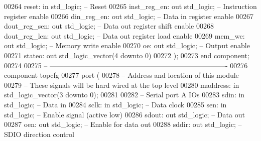 \begin{DoxyCode}
00264         reset: \textcolor{keywordflow}{in} \textcolor{comment}{std\_logic};                \textcolor{keyword}{-- Reset}
00265         inst\_reg\_en: \textcolor{keywordflow}{out} \textcolor{comment}{std\_logic};         \textcolor{keyword}{-- Instruction register enable}
00266         din\_reg\_en: \textcolor{keywordflow}{out} \textcolor{comment}{std\_logic};          \textcolor{keyword}{-- Data in register enable}
00267         dout\_reg\_sen: \textcolor{keywordflow}{out} \textcolor{comment}{std\_logic};            \textcolor{keyword}{-- Data out register shift enable}
00268         dout\_reg\_len: \textcolor{keywordflow}{out} \textcolor{comment}{std\_logic};            \textcolor{keyword}{-- Data out register load enable}
00269         mem\_we: \textcolor{keywordflow}{out} \textcolor{comment}{std\_logic};              \textcolor{keyword}{-- Memory write enable}
00270         oe: \textcolor{keywordflow}{out} \textcolor{comment}{std\_logic};              \textcolor{keyword}{-- Output enable}
00271         stateo: \textcolor{keywordflow}{out} \textcolor{comment}{std\_logic\_vector}(\textcolor{vhdllogic}{}\textcolor{vhdllogic}{4} \textcolor{keywordflow}{downto} \textcolor{vhdllogic}{}\textcolor{vhdllogic}{0})
00272     );
00273 \textcolor{keywordflow}{end} \textcolor{keywordflow}{component};
00274 
00275 \textcolor{keyword}{-- ----------------------------------------------------------------------------}
00276 \textcolor{keywordflow}{component} topcfg
00277     \textcolor{keywordflow}{port} (
00278 \textcolor{keyword}{        -- Address and location of this module}
00279 \textcolor{keyword}{        -- These signals will be hard wired at the top level}
00280         maddress: \textcolor{keywordflow}{in} \textcolor{comment}{std\_logic\_vector}(\textcolor{vhdllogic}{}\textcolor{vhdllogic}{3} \textcolor{keywordflow}{downto} \textcolor{vhdllogic}{}\textcolor{vhdllogic}{0});
00281     
00282 \textcolor{keyword}{        -- Serial port A IOs}
00283         sdin: \textcolor{keywordflow}{in} \textcolor{comment}{std\_logic};     \textcolor{keyword}{-- Data in}
00284         sclk: \textcolor{keywordflow}{in} \textcolor{comment}{std\_logic};     \textcolor{keyword}{-- Data clock}
00285         sen: \textcolor{keywordflow}{in} \textcolor{comment}{std\_logic};  \textcolor{keyword}{-- Enable signal (active low)}
00286         sdout: \textcolor{keywordflow}{out} \textcolor{comment}{std\_logic};   \textcolor{keyword}{-- Data out}
00287         oen: \textcolor{keywordflow}{out} \textcolor{comment}{std\_logic};         \textcolor{keyword}{-- Enable for data out}
00288         sddir: \textcolor{keywordflow}{out} \textcolor{comment}{std\_logic};   \textcolor{keyword}{-- SDIO  direction control}

\end{DoxyCode}
